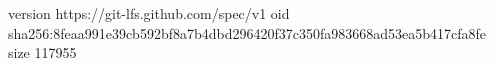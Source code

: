 version https://git-lfs.github.com/spec/v1
oid sha256:8feaa991e39cb592bf8a7b4dbd296420f37c350fa983668ad53ea5b417cfa8fe
size 117955
